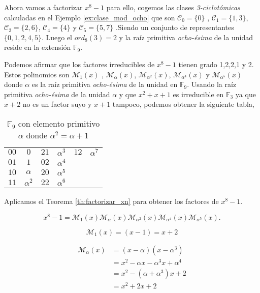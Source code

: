 \begin{exampleth}
Ahora vamos a factorizar $x^8-1$ para ello, cogemos las clases \textit{3-ciclotómicas} calculadas en el Ejemplo \ref{ex:clase_mod_ocho} que son $\mathcal{C}_0 = \{ 0 \}$ , $\mathcal{C}_1 = \{ 1,3 \}$, $\mathcal{C}_2 = \{ 2,6 \}$,  $\mathcal{C}_4 = \{ 4 \}$ y  $\mathcal{C}_5 = \{ 5,7 \}$ .Siendo un conjunto de representantes $\{ 0,1,2,4,5 \}$. Luego el $ord_8(3) = 2$ y la raíz primitiva \textit{ocho-ésima} de la unidad reside en la extensión $\mathbb{F}_{9}$.

Podemos afirmar que los factores irreducibles de $x^8-1$ tienen grado 1,2,2,1 y 2. Estos polinomios son $\mathcal{M}_{1}(x)$ , $\mathcal{M}_{\alpha}(x)$, $\mathcal{M}_{\alpha^2}(x)$,  $\mathcal{M}_{\alpha^4}(x)$ y  $\mathcal{M}_{\alpha^5}(x)$ donde $\alpha$ es la  raíz primitiva \textit{ocho-ésima} de la unidad en $\mathbb{F}_{9}$. Usando la raíz primitiva \textit{ocho-ésima} de la unidad $\alpha$ y que $x^2 + x +1$ es irreducible en $\mathbb{F}_3$ ya que $x+2$ no es un factor suyo y $x+1$ tampoco, podemos obtener la siguiente tabla,

\begin{table}[H]
\begin{tabular}{ c | c | c | c | c | c | }

	 
$00$ & $0$  & $21$ & $\alpha^3$ & $12$ & $\alpha^7$  \\
$01$ & $1$  & $02$ & $\alpha^4$   \\
$10$ & $\alpha$  & $20$ & $\alpha^5$    \\
$11$ & $\alpha^2$  & $22$ & $\alpha^6$  \\
	\end{tabular}
\caption{$\mathbb{F}_{9}$ con elemento primitivo $\alpha$ donde $\alpha^2 = \alpha +1$}
\end{table}

Aplicamos el Teorema \ref{th:factorizar_xn} para obtener los factores de $x^8-1$.

\[ x^8-1 = \mathcal{M}_{1}(x) \mathcal{M}_{\alpha}(x) \mathcal{M}_{\alpha^2}(x) \mathcal{M}_{\alpha^4}(x) \mathcal{M}_{\alpha^5}(x). \]



\begin{equation*}
 \mathcal{M}_1(x)  = (x-1) = x+2 
\end{equation*}
 
 \begin{equation*}
 \begin{split}
 \mathcal{M}_{\alpha}(x) & = (x-\alpha)(x-\alpha^3) \\
 	& = x^2 -\alpha x - \alpha^3 x + \alpha^4 \\
 	& = x^2 - (\alpha + \alpha^3)x + 2 \\
 	& = x^2 + 2x + 2
 \end{split}
 \end{equation*}
 

\end{exampleth}

